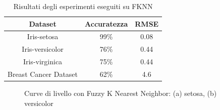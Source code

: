 \documentclass[11pt,  oneside, openany]{book}
\begin{document}
\begin{table} [h!]
      \begin{center}\begin{tabular}{ |c|c|c| } 
        \hline
        Dataset & Accuratezza & RMSE\\
        \hline
        Iris-setosa & 99\% & 0.08 \\
        \hline
        Iris-versicolor & 76\% & 0.44 \\
        \hline
        Iris-virginica & 75\% & 0.44 \\
        \hline
        Breast Cancer Dataset & 62\% & 4.6 \\
        \hline                  
      \end{tabular}
    \end{center}
     \caption{Risultati degli esperimenti eseguiti su FKNN}
    \label{tab:fknn}  
    \end{table}

\begin{figure}[h!]
		\centering
		\quad
		 \quad
		\caption{Curve di livello con Fuzzy K Nearest Neighbor: (a) setosa, (b) versicolor}
		\label{fknn-set}
	\end{figure}	
\end{document}
